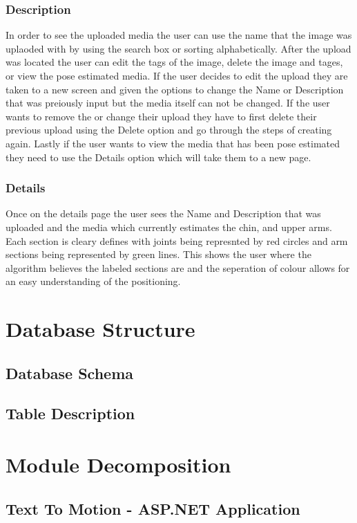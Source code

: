 \documentclass{scrreprt}
\begin{document}
\subsection{Description}
In order to see the uploaded media the user can use the name that the image was uplaoded with by using the search box or sorting alphabetically. After the upload was located the user can edit the tags of the image, delete the image and tages, or view the pose estimated media. If the user decides to edit the upload they are taken to a new screen and given the options to change the Name or Description that was preiously input but the media itself can not be changed. If the user wants to remove the or change their upload they have to first delete their previous upload using the Delete option and go through the steps of creating again. Lastly if the user wants to view the media that has been pose estimated they need to use the Details option which will take them to a new page.

\subsection{Details}
Once on the details page the user sees the Name and Description that was uploaded and the media which currently estimates the chin, and upper arms. Each section is cleary defines with joints being represnted by red circles and arm sections being represented by green lines. This shows the user where the algorithm believes the labeled sections are and the seperation of colour allows for an easy understanding of the positioning. 

\chapter{Database Structure}

\section{Database Schema}
\section{Table Description}

\chapter{Module Decomposition}

\section{Text To Motion - ASP.NET Application}
\end{document}

